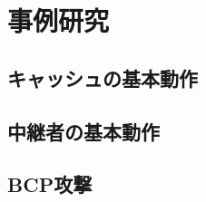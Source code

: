 \documentclass[12pt,a4paper]{jbook}
\begin{document}
\newpage

\chapter{事例研究}
\section{キャッシュの基本動作}

\section{中継者の基本動作}

\section{BCP攻撃}
\end{document}
